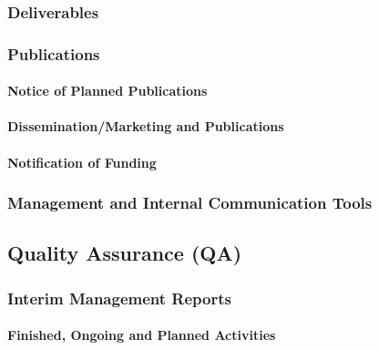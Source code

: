 \documentclass[
  11pt,
]{article}
\begin{document}
\hypertarget{deliverables}{%
\subsubsection{Deliverables}\label{deliverables}}

\hypertarget{publications}{%
\subsubsection{Publications}\label{publications}}

\hypertarget{notice-of-planned-publications}{%
\paragraph{Notice of Planned
Publications}\label{notice-of-planned-publications}}

\hypertarget{disseminationmarketing-and-publications}{%
\paragraph{Dissemination/Marketing and
Publications}\label{disseminationmarketing-and-publications}}

\hypertarget{notification-of-funding}{%
\paragraph{Notification of Funding}\label{notification-of-funding}}

\hypertarget{management-and-internal-communication-tools}{%
\subsubsection{Management and Internal Communication
Tools}\label{management-and-internal-communication-tools}}

\hypertarget{quality-assurance-qa}{%
\subsection{Quality Assurance (QA)}\label{quality-assurance-qa}}

\hypertarget{interim-management-reports}{%
\subsubsection{Interim Management
Reports}\label{interim-management-reports}}

\hypertarget{finished-ongoing-and-planned-activities}{%
\paragraph{Finished, Ongoing and Planned
Activities}\label{finished-ongoing-and-planned-activities}}
\end{document}
